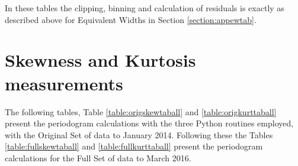 \begin{table}[!htbp]
\centering
{}
\caption{This table shows the 5 highest peaks from the periodograms for Peak Ratios with various treatments of the
  Full Set of data to March 2916.}
\protect\label{table:fullprtaball}
\end{table}

In these tables the clipping, binning and calculation of residuals is exactly as described above for Equivalent Widths
in Section \ref{section:appewtab}.

\section{Skewness and Kurtosis measurements}
\protect\label{section:appkstab}

The following tables, Table \ref{table:origskewtaball} and \ref{table:origkurttaball} present the periodogram
calculations with the three Python routines employed, with the Original Set of {\harps} data to January 2014. Following
these the Tables \ref{table:fullskewtaball} and \ref{table:fullkurttaball} present the periodogram calculations for the
Full Set of data to March 2016.

